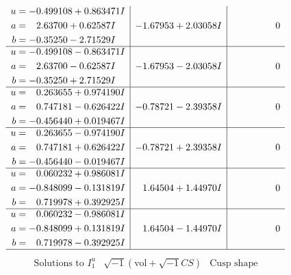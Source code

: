 \documentclass[1p]{elsarticle_modified}
\theoremstyle{definition}
\newcommand{\I}{\sqrt{-1}}
\begin{document}
$$\begin{array}{c|c|c}
\begin{aligned}
u &= -0.499108 + 0.863471 I \\
a &= \phantom{-}2.63700 + 0.62587 I \\
b &= -0.35250 - 2.71529 I\end{aligned}
 & -1.67953 + 2.03058 I & \phantom{-0.000000 } 0 \\ \hline\begin{aligned}
u &= -0.499108 - 0.863471 I \\
a &= \phantom{-}2.63700 - 0.62587 I \\
b &= -0.35250 + 2.71529 I\end{aligned}
 & -1.67953 - 2.03058 I & \phantom{-0.000000 } 0 \\ \hline\begin{aligned}
u &= \phantom{-}0.263655 + 0.974190 I \\
a &= \phantom{-}0.747181 - 0.626422 I \\
b &= -0.456440 + 0.019467 I\end{aligned}
 & -0.78721 - 2.39358 I & \phantom{-0.000000 } 0 \\ \hline\begin{aligned}
u &= \phantom{-}0.263655 - 0.974190 I \\
a &= \phantom{-}0.747181 + 0.626422 I \\
b &= -0.456440 - 0.019467 I\end{aligned}
 & -0.78721 + 2.39358 I & \phantom{-0.000000 } 0 \\ \hline\begin{aligned}
u &= \phantom{-}0.060232 + 0.986081 I \\
a &= -0.848099 - 0.131819 I \\
b &= \phantom{-}0.719978 + 0.392925 I\end{aligned}
 & \phantom{-}1.64504 + 1.44970 I & \phantom{-0.000000 } 0 \\ \hline\begin{aligned}
u &= \phantom{-}0.060232 - 0.986081 I \\
a &= -0.848099 + 0.131819 I \\
b &= \phantom{-}0.719978 - 0.392925 I\end{aligned}
 & \phantom{-}1.64504 - 1.44970 I & \phantom{-0.000000 } 0\\
 \hline 
 \end{array}$$\newpage$$\begin{array}{c|c|c}  
\text{Solutions to }I^u_{1}& \I (\text{vol} + \sqrt{-1}CS) & \text{Cusp shape}\\
 \hline 
\begin{aligned}

\end{aligned}
\end{array}$$
\end{document}
